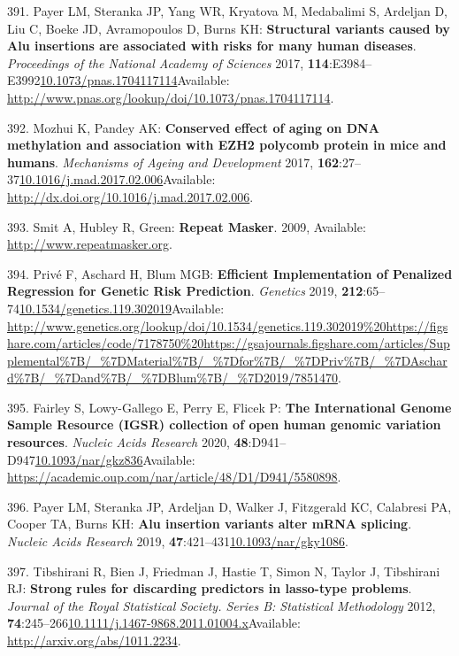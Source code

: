 \documentclass[
]{book}
\begin{document}
\leavevmode\hypertarget{ref-Payer2017}{}%
391. Payer LM, Steranka JP, Yang WR, Kryatova M, Medabalimi S, Ardeljan D, Liu C, Boeke JD, Avramopoulos D, Burns KH: \textbf{Structural variants caused by Alu insertions are associated with risks for many human diseases}. \emph{Proceedings of the National Academy of Sciences} 2017, \textbf{114}:E3984--E3992\href{https://doi.org/10.1073/pnas.1704117114}{10.1073/pnas.1704117114}Available: \url{http://www.pnas.org/lookup/doi/10.1073/pnas.1704117114}.

\leavevmode\hypertarget{ref-Mozhui2017}{}%
392. Mozhui K, Pandey AK: \textbf{Conserved effect of aging on DNA methylation and association with EZH2 polycomb protein in mice and humans}. \emph{Mechanisms of Ageing and Development} 2017, \textbf{162}:27--37\href{https://doi.org/10.1016/j.mad.2017.02.006}{10.1016/j.mad.2017.02.006}Available: \url{http://dx.doi.org/10.1016/j.mad.2017.02.006}.

\leavevmode\hypertarget{ref-Smit2009}{}%
393. Smit A, Hubley R, Green: \textbf{Repeat Masker}. 2009, Available: \url{http://www.repeatmasker.org}.

\leavevmode\hypertarget{ref-Prive2019}{}%
394. Privé F, Aschard H, Blum MGB: \textbf{Efficient Implementation of Penalized Regression for Genetic Risk Prediction}. \emph{Genetics} 2019, \textbf{212}:65--74\href{https://doi.org/10.1534/genetics.119.302019}{10.1534/genetics.119.302019}Available: \url{http://www.genetics.org/lookup/doi/10.1534/genetics.119.302019\%20https://figshare.com/articles/code/7178750\%20https://gsajournals.figshare.com/articles/Supplemental\%7B/_\%7DMaterial\%7B/_\%7Dfor\%7B/_\%7DPriv\%7B/_\%7DAschard\%7B/_\%7Dand\%7B/_\%7DBlum\%7B/_\%7D2019/7851470}.

\leavevmode\hypertarget{ref-Fairley2020}{}%
395. Fairley S, Lowy-Gallego E, Perry E, Flicek P: \textbf{The International Genome Sample Resource (IGSR) collection of open human genomic variation resources}. \emph{Nucleic Acids Research} 2020, \textbf{48}:D941--D947\href{https://doi.org/10.1093/nar/gkz836}{10.1093/nar/gkz836}Available: \url{https://academic.oup.com/nar/article/48/D1/D941/5580898}.

\leavevmode\hypertarget{ref-Payer2019}{}%
396. Payer LM, Steranka JP, Ardeljan D, Walker J, Fitzgerald KC, Calabresi PA, Cooper TA, Burns KH: \textbf{Alu insertion variants alter mRNA splicing}. \emph{Nucleic Acids Research} 2019, \textbf{47}:421--431\href{https://doi.org/10.1093/nar/gky1086}{10.1093/nar/gky1086}.

\leavevmode\hypertarget{ref-Tibshirani2012}{}%
397. Tibshirani R, Bien J, Friedman J, Hastie T, Simon N, Taylor J, Tibshirani RJ: \textbf{Strong rules for discarding predictors in lasso-type problems}. \emph{Journal of the Royal Statistical Society. Series B: Statistical Methodology} 2012, \textbf{74}:245--266\href{https://doi.org/10.1111/j.1467-9868.2011.01004.x}{10.1111/j.1467-9868.2011.01004.x}Available: \url{http://arxiv.org/abs/1011.2234}.
\end{document}
